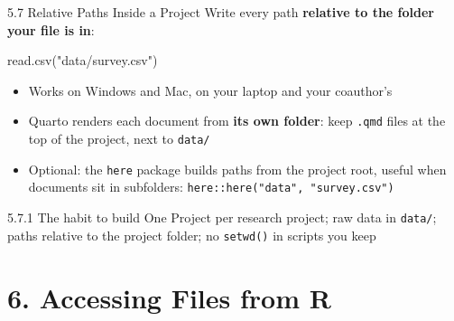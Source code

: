 \documentclass[
  ignorenonframetext,
  aspectratio=169,
]{beamer}
\newenvironment{Shaded}{\begin{snugshade}}{\end{snugshade}}
\newcommand{\FunctionTok}[1]{\textcolor[rgb]{0.28,0.35,0.67}{#1}}
\newcommand{\NormalTok}[1]{\textcolor[rgb]{0.00,0.23,0.31}{#1}}
\newcommand{\StringTok}[1]{\textcolor[rgb]{0.13,0.47,0.30}{#1}}
\providecommand{\tightlist}{%
  \setlength{\itemsep}{0pt}\setlength{\parskip}{0pt}}
\begin{document}
\begin{frame}[fragile]{5.7 Relative Paths Inside a Project}
\protect{}\label{sec-relative}
Write every path \textbf{relative to the folder your file is in}:

\begin{Shaded}
\begin{Highlighting}[]
\FunctionTok{read.csv}\NormalTok{(}\StringTok{"data/survey.csv"}\NormalTok{)}
\end{Highlighting}
\end{Shaded}

\begin{itemize}
\tightlist
\item
  Works on Windows and Mac, on your laptop and your coauthor's
\item
  Quarto renders each document from \textbf{its own folder}: keep
  \texttt{.qmd} files at the top of the project, next to \texttt{data/}
\item
  Optional: the \texttt{here} package builds paths from the project
  root, useful when documents sit in subfolders:
  \texttt{here::here("data",\ "survey.csv")}
\end{itemize}

\begin{exampleblock}{5.7.1 The habit to build}
\protect{}\label{the-habit-to-build}
One Project per research project; raw data in \texttt{data/}; paths
relative to the project folder; no \texttt{setwd()} in scripts you keep
\end{exampleblock}
\end{frame}

\section{6. Accessing Files from R}\label{sec-files}
\end{document}
